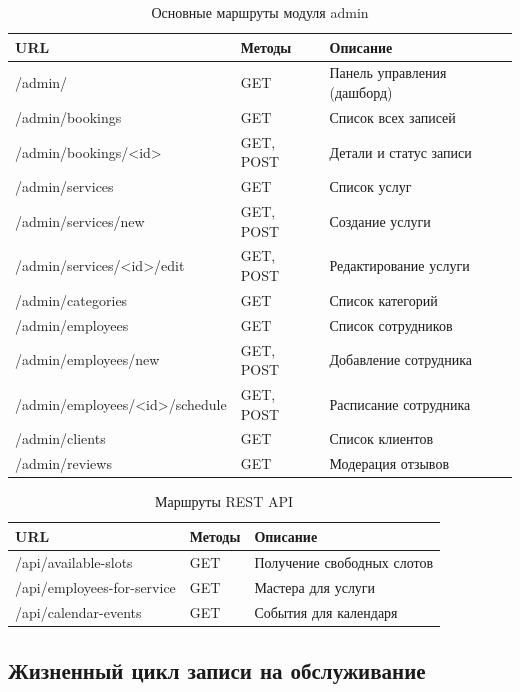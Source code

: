 \documentclass[14pt,a4paper,oneside]{extarticle}
\begin{document}
\begin{table}[H]
\caption{Основные маршруты модуля admin}\label{tab:routes_admin}
\centering
\begin{tabularx}{\textwidth}{|l|l|X|}
\hline
\textbf{URL} & \textbf{Методы} & \textbf{Описание} \\
\hline
/admin/ & GET & Панель управления (дашборд) \\
\hline
/admin/bookings & GET & Список всех записей \\
\hline
/admin/bookings/<id> & GET, POST & Детали и статус записи \\
\hline
/admin/services & GET & Список услуг \\
\hline
/admin/services/new & GET, POST & Создание услуги \\
\hline
/admin/services/<id>/edit & GET, POST & Редактирование услуги \\
\hline
/admin/categories & GET & Список категорий \\
\hline
/admin/employees & GET & Список сотрудников \\
\hline
/admin/employees/new & GET, POST & Добавление сотрудника \\
\hline
/admin/employees/<id>/schedule & GET, POST & Расписание сотрудника \\
\hline
/admin/clients & GET & Список клиентов \\
\hline
/admin/reviews & GET & Модерация отзывов \\
\hline
\end{tabularx}
\end{table}

\begin{table}[H]
\caption{Маршруты REST API}\label{tab:routes_api}
\centering
\begin{tabularx}{\textwidth}{|l|l|X|}
\hline
\textbf{URL} & \textbf{Методы} & \textbf{Описание} \\
\hline
/api/available-slots & GET & Получение свободных слотов \\
\hline
/api/employees-for-service & GET & Мастера для услуги \\
\hline
/api/calendar-events & GET & События для календаря \\
\hline
\end{tabularx}
\end{table}

\subsection{Жизненный цикл записи на обслуживание}
\end{document}
